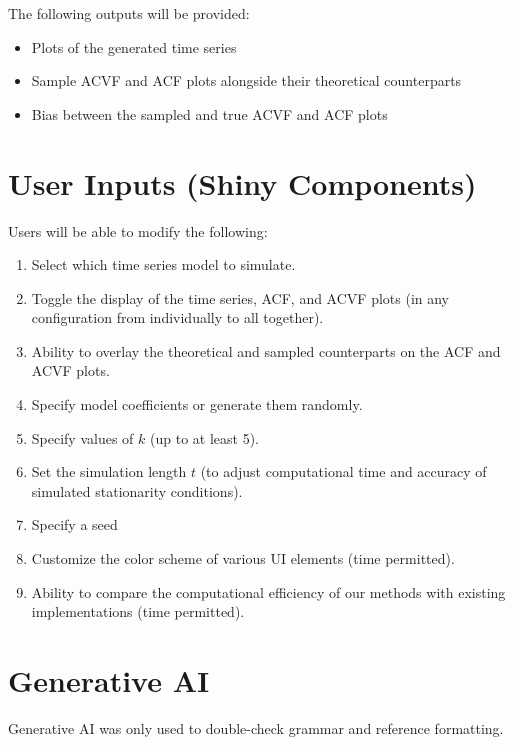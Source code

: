 \documentclass[11pt]{article}
\begin{document}
\newpage

\noindent The following outputs will be provided:
\begin{itemize}
    \item Plots of the generated time series
    \item Sample ACVF and ACF plots alongside their theoretical counterparts
    \item Bias between the sampled and true ACVF and ACF plots
\end{itemize}

\section{User Inputs (Shiny Components)}

Users will be able to modify the following:
\begin{enumerate}
    \item Select which time series model to simulate.
    
    \item Toggle the display of the time series, ACF, and ACVF plots (in any configuration from individually to all together).

    \item Ability to overlay the theoretical and sampled counterparts on the ACF and ACVF plots.

    \item Specify model coefficients or generate them randomly.

    \item Specify values of $k$ (up to at least 5).

    \item Set the simulation length $t$ (to adjust computational time and accuracy of simulated stationarity conditions).

    \item Specify a seed

    \item Customize the color scheme of various UI elements (time permitted).

    \item Ability to compare the computational efficiency of our methods with existing implementations (time permitted).
\end{enumerate}

\section{Generative AI}

Generative AI was only used to double-check grammar and reference formatting.

\nocite{tidyverse}
\nocite{shiny}
\nocite{tseries}
\nocite{testthat}



\end{document}
